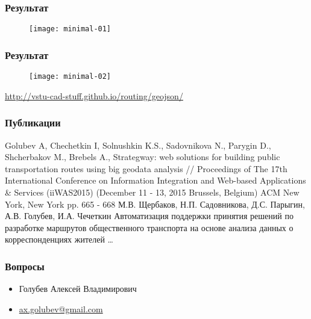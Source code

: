 



\begin{frame}
    \frametitle{Результат}
    \begin{figure}[ht!]
        \centering
        \texttt{[image: minimal-01]}
    \end{figure}
\end{frame}

\begin{frame}
    \frametitle{Результат}
    \begin{figure}[ht!]
        \centering
        \texttt{[image: minimal-02]}
    \end{figure}
    \url{http://vstu-cad-stuff.github.io/routing/geojson/}
\end{frame}

\begin{frame}
    \frametitle{Публикации}
    \footnotesize
    \begin{thebibliography}{10}
         Golubev A, Chechetkin I, Solnushkin K.S., Sadovnikova N., Parygin D., Shcherbakov M., 
            Brebels A., Strategway: web solutions for building public transportation routes using big geodata 
            analysis // Proceedings of The 17th International Conference on Information Integration and 
            Web-based Applications \& Services (iiWAS2015) (December 11 - 13, 2015 Brussels, Belgium) 
            ACM New York, New York pp. 665 - 668
         М.В. Щербаков, Н.П. Садовникова, Д.С. Парыгин, А.В. Голубев, И.А. Чечеткин 
            Автоматизация поддержки принятия решений по разработке маршрутов общественного транспорта на 
            основе анализа данных о корреспонденциях жителей
         \ldots
    \end{thebibliography}
\end{frame}

\begin{frame}
    \frametitle{Вопросы}
    \begin{itemize}
        \item Голубев Алексей Владимирович
        \item \href{mailto:ax.golubev@gmail.com}{ax.golubev@gmail.com}
    \end{itemize}
\end{frame}